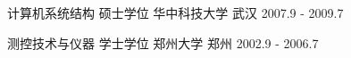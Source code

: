 

\begin{cventries}

  \cventry
    {计算机系统结构 硕士学位} %
    {华中科技大学} %
    {武汉} %
    {2007.9 - 2009.7} %
    {
      \begin{cvitems} %
      \end{cvitems}
    }

  \cventry
    {测控技术与仪器 学士学位} %
    {郑州大学} %
    {郑州} %
    {2002.9 - 2006.7} %
    {
      \begin{cvitems} %
      \end{cvitems}
    }

\end{cventries}

